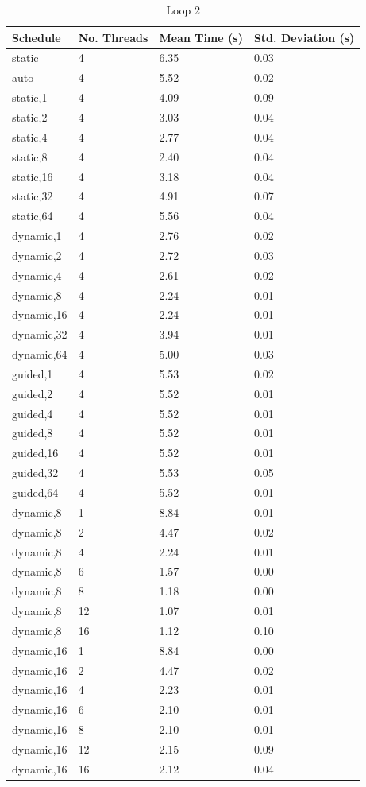 \documentclass[a4paper,12pt]{article}
\begin{document}
\begin {table}[H]
\caption {Loop 2}
\small
\center
\begin{tabular}{ | l | l | l | l | }
\hline
	Schedule &  No. Threads &  Mean Time (s) &  Std. Deviation (s) \\ \hline 
	static & 4 & 6.35 & 0.03 \\
	auto & 4 & 5.52 & 0.02 \\ 
	static,1 & 4 & 4.09 & 0.09 \\ 
	static,2 & 4 & 3.03 & 0.04 \\ 
	static,4 & 4 & 2.77 & 0.04 \\
	static,8 & 4 & 2.40 & 0.04 \\
	static,16 & 4 & 3.18 & 0.04 \\ 
	static,32 & 4 & 4.91 & 0.07 \\
	static,64 & 4 & 5.56 & 0.04 \\
	dynamic,1 & 4 & 2.76 & 0.02 \\
	dynamic,2 & 4 & 2.72 & 0.03 \\
	dynamic,4 & 4 & 2.61 & 0.02 \\
	dynamic,8 & 4 & 2.24 & 0.01 \\
	dynamic,16 & 4 & 2.24 & 0.01 \\
	dynamic,32 & 4 & 3.94 & 0.01 \\
	dynamic,64 & 4 & 5.00 & 0.03 \\
	guided,1 & 4 & 5.53 & 0.02 \\
	guided,2 & 4 & 5.52 & 0.01 \\
	guided,4 & 4 & 5.52 & 0.01 \\
	guided,8 & 4 & 5.52 & 0.01 \\ 
	guided,16 & 4 & 5.52 & 0.01 \\ 
	guided,32 & 4 & 5.53 & 0.05 \\ 
	guided,64 & 4 & 5.52 & 0.01 \\
	dynamic,8 & 1& 8.84 & 0.01\\
	dynamic,8 & 2& 4.47 & 0.02\\
dynamic,8 & 4 & 2.24 & 0.01\\
dynamic,8 & 6 & 1.57 & 0.00\\
dynamic,8 & 8 & 1.18 & 0.00\\
dynamic,8 & 12 & 1.07 & 0.01\\
dynamic,8 & 16 & 1.12 & 0.10\\
dynamic,16 & 1 & 8.84 & 0.00\\
dynamic,16 & 2 & 4.47 & 0.02\\
dynamic,16 & 4 & 2.23 & 0.01\\
dynamic,16 & 6 & 2.10 & 0.01\\
dynamic,16 & 8 & 2.10 & 0.01\\
dynamic,16 & 12 & 2.15 & 0.09\\
dynamic,16 & 16 & 2.12 & 0.04 \\ \hline
\end{tabular}
\end{table}
\end{document}
